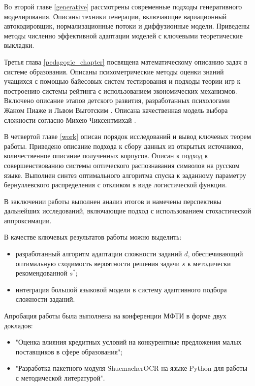 Во второй главе \ref{generative} рассмотрены современные подходы генеративного моделирования. Описаны техники 
генерации, включающие вариационный автокодировщик, нормализационные потоки и диффузионные модели. Приведены 
методы численно эффективной адаптации моделей  с ключевыми теоретические выкладки.

Третья глава \ref{pedagogic_chapter} посвящена математическому описанию задач в системе образования. Описаны психометрические методы 
оценки знаний учащихся с помощью байесовых систем тестирования и подходы теории игр к построению системы рейтинга 
с использованием экономических механизмов. Включено описание этапов детского развития, разработанных психологами Жаном Пиаже \cite{piaget1952origins} и Львом Выготским \cite{выготский2014мышление}.
Описана качественная модель выбора сложности согласно Михею Чиксентмихай \cite{chen2007flow}.

В четвертой главе \ref{work} описан порядок исследований и вывод ключевых теорем работы. Приведено описание подхода к сбору данных из открытых источников, количественное
описание полученных корпусов. Описан к подход к совершенствованию системы оптического распознавания символов на русском языке. Выполнен синтез 
оптимального алгоритма спуска к заданному параметру бернуллевского распределения с откликом в виде логистической функции. 

В заключении работы выполнен анализ итогов и намечены перспективы дальнейших исследований, включающие подход с использованием
 стохастической аппроксимации.

В качестве ключевых результатов работы можно выделить: \begin{itemize}
    \item разработанный алгоритм адаптации сложности заданий $d$, обеспечивающий оптимальную сходимость вероятности решения задачи $s$ к методически рекомендованной $s^*$;
    \item интеграция большой языковой модели в систему адаптивного подбора сложности заданий.
\end{itemize}

Апробация работы была выполнена на конференции МФТИ в форме двух докладов: \begin{itemize}
    \item "Оценка влияния кредитных условий на конкурентные предложения малых поставщиков в сфере образования";
    \item "Разработка пакетного модуля ShuemacherOCR на языке Python для работы с методической литературой".
\end{itemize}
